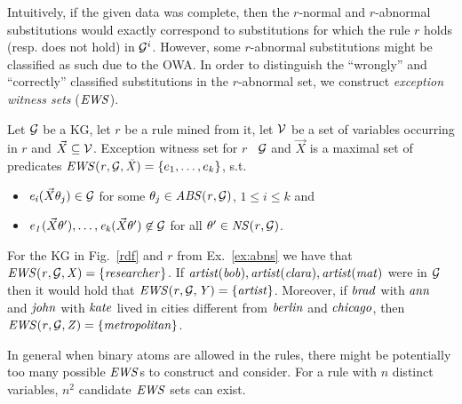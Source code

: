 Intuitively, if the given data was complete, then the $r$-normal and $r$-abnormal substitutions would exactly correspond to substitutions for which
the rule $r$ holds (resp. does not hold) in $\mathcal{G}^i$. However, some $r$-abnormal substitutions
might be classified as such due to the OWA.  In order to distinguish the ``wrongly'' and ``correctly'' classified substitutions in the $r$-abnormal set, we construct \emph{exception witness sets} ($\mathit{EWS}$).


\begin{definition} \label{def:ews}
Let $\mathcal{G}$ be a KG, let $r$ be a rule mined from it, let $\mathcal{V}$ be a set of variables occurring in $r$ and $\vec{X}\subseteq \mathcal{V}$. Exception witness set for $r$ \wrt\ $\mathcal{G}$ and $\vec{X}$ is a maximal set of predicates $\mathit{EWS(r,\mathcal{G},\vec{X})}=\{e_1,\dotsc,e_k\}$, s.t.
\begin{itemize}
\item $\mathit{e_i}(\vec{X}\theta_j)\in \mathcal{G}$ for some $\theta_j\in \mathit{ABS(r,\mathcal{G})}$, $1 \leq i\leq k$ and
\item $\mathit{e_1}(\vec{X}\theta'),\dotsc,\mathit{e_k}(\vec{X}\theta')\not \in \mathcal{G}$ for all $\theta' \in \mathit{NS(r,\mathcal{G})}$.
\end{itemize}
\end{definition}


\begin{example}
For the KG in Fig.~\ref{rdf} and $r$ from Ex.~\ref{ex:abns} we have that $\mathit{EWS(r,\mathcal{G},X)}=\{\mathit{researcher}\}$. If $\mathit{artist(bob), artist(clara),artist(mat)}$ were in $\mathcal{G}$ then it would hold that  $\mathit{EWS(r,\mathcal{G},Y)}=\{\mathit{artist}\}$. Moreover, if $\mathit{brad}$ with $\mathit{ann}$ and $\mathit{john}$ with $\mathit{kate}$ lived in cities different from $\mathit{berlin}$ and $\mathit{chicago}$, then $\mathit{EWS(r,\mathcal{G},Z)}=\{\mathit{metropolitan}\}$. 
\end{example}
In general when binary atoms are allowed in the rules, there might be potentially too many possible $\mathit{EWS}$s to construct and consider. %
For a rule with $n$ distinct variables, $n^2$ candidate $\mathit{EWS}$ sets can exist. %
